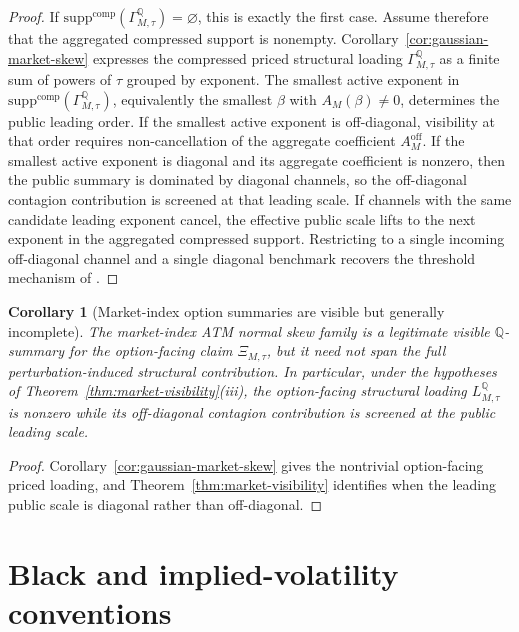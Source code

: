 \documentclass[11pt,a4paper]{amsart}
\theoremstyle{plain}
\newtheorem{corollary}[theorem]{Corollary}
\theoremstyle{definition}
\theoremstyle{remark}
\newcommand{\QQ}{\mathbb{Q}}
\begin{document}
\begin{proof}
If \(\mathrm{supp}^{\mathrm{comp}}(\Gamma_{M,\tau}^\QQ)=\varnothing\), this is exactly the first
case.  Assume therefore that the aggregated compressed support is nonempty.
Corollary~\ref{cor:gaussian-market-skew} expresses the compressed priced structural loading
\(\Gamma_{M,\tau}^\QQ\) as a finite sum of powers of \(\tau\) grouped by exponent.  The smallest
active exponent in \(\mathrm{supp}^{\mathrm{comp}}(\Gamma_{M,\tau}^\QQ)\), equivalently the
smallest \(\beta\) with \(A_M(\beta)\neq0\), determines the public leading order.  If the smallest
active exponent is off-diagonal, visibility at that order requires non-cancellation of the
aggregate coefficient \(A_M^{\mathrm{off}}\).  If the smallest active exponent is diagonal and its
aggregate coefficient is nonzero, then the public summary is dominated by diagonal channels, so the
off-diagonal contagion contribution is screened at that leading scale.  If channels with the same
candidate leading exponent cancel, the effective public scale lifts to the next exponent in the
aggregated compressed support.  Restricting to a single incoming off-diagonal channel and a single
diagonal benchmark recovers the threshold mechanism of \cite{vidal2026latent}.
\end{proof}

\begin{corollary}[Market-index option summaries are visible but generally incomplete]\label{cor:market-index-option-summaries}
The market-index ATM normal skew family is a legitimate visible \(\QQ\)-summary for the
option-facing claim \(\Xi_{M,\tau}\), but it need not span the full perturbation-induced
structural contribution.  In
particular, under the hypotheses of Theorem~\ref{thm:market-visibility}(iii), the option-facing
structural loading \(L_{M,\tau}^\QQ\) is nonzero while its off-diagonal contagion contribution is
screened at the public leading scale.
\end{corollary}

\begin{proof}
Corollary~\ref{cor:gaussian-market-skew} gives the nontrivial option-facing priced loading, and
Theorem~\ref{thm:market-visibility} identifies when the leading public scale is diagonal rather
than off-diagonal.
\end{proof}

\section{Black and implied-volatility conventions}\label{sec:black}
\end{document}
